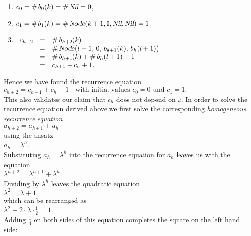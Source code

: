 \begin{enumerate}
\item $c_0 = \#\, b_0(k) = \#\, \textsl{Nil} = 0$,
\item $c_1 = \#\, b_1(k) = \#\, \textsl{Node}(k+1,0,\textsl{Nil}, \textsl{Nil}) = 1$, 
\item$\begin{array}[t]{lcl}
       c_{h+2} & = & \#\, b_{h+2}(k) \\
               & = & \#\,\textsl{Node}\bigl(l+1,\,0,\,b_{h+1}(k),\,b_h(l+1)\bigr) \\
               & = & \#\, b_{h+1}(k) + \#\, b_h(l+1) + 1 \\
               & = & c_{h+1} + c_h + 1.
       \end{array}$
\end{enumerate}
Hence we have found the recurrence equation 
\\[0.2cm]
\hspace*{1.3cm}
$c_{h+2} = c_{h+1} + c_h + 1 \quad \mbox{with initial values $c_0 = 0$ und $c_1 = 1$}.$
\\[0.2cm]
This also validates our claim that $c_h$ does not depend on $k$.  In order to solve the recurrence
equation derived above we first solve the corresponding \emph{homogeneous recurrence equation} 
\\[0.2cm]
\hspace*{1.3cm}
$a_{h+2} = a_{h+1} + a_h$
\\[0.2cm]
using the  ansatz
\\[0.2cm]
\hspace*{1.3cm}
$a_h = \lambda^h$.
\\[0.2cm]
Substituting $a_h = \lambda^h$ into the recurrence equation for $a_h$ leaves us with the equation
\\[0.2cm]
\hspace*{1.3cm}
$\lambda^{h+2} = \lambda^{h+1} + \lambda^{h}$.
\\[0.2cm]
Dividing by $\lambda^h$ leaves the quadratic equation
\\[0.2cm]
\hspace*{1.3cm}
$\lambda^2 = \lambda + 1$
\\[0.2cm]
which can be rearranged as
\\[0.2cm]
\hspace*{1.3cm}
$\lambda^2 - 2 \cdot \lambda \cdot \frac{1}{2} = 1$.
\\[0.2cm]
Adding $\frac{1}{4}$ on both sides of this equation completes the square on the left hand side:
\\[0.2cm]
